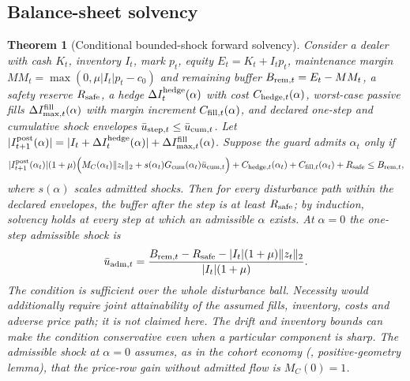 \documentclass[12pt]{article}
\newtheorem{theorem}{Theorem}[section]
\theoremstyle{definition}
\theoremstyle{remark}
\begin{document}
\subsection{Balance-sheet solvency}

\begin{theorem}[Conditional bounded-shock forward solvency]\label{thm:forward}
Consider a dealer with cash $K_t$, inventory $I_t$, mark $p_t$, equity $E_t=K_t+I_tp_t$, maintenance margin $MM_t=\max(0,\mu|I_t|p_t-c_0)$ and remaining buffer $B_{{\rm rem},t}=E_t-MM_t$, a safety reserve $R_{\rm safe}$, a hedge $\Delta I^{\rm hedge}_t(\alpha)$ with cost $C_{{\rm hedge},t}(\alpha)$, worst-case passive fills $\Delta I^{\rm fill}_{\max,t}(\alpha)$ with margin increment $C_{{\rm fill},t}(\alpha)$, and declared one-step and cumulative shock envelopes $\bar u_{{\rm step},t}\le\bar u_{{\rm cum},t}$. Let $|I^{\rm post}_{t+1}(\alpha)|=|I_t+\Delta I^{\rm hedge}_t(\alpha)|+\Delta I^{\rm fill}_{\max,t}(\alpha)$. Suppose the guard admits $\alpha_t$ only if
\begin{equation}\label{eq:guardineq}
|I^{\rm post}_{t+1}(\alpha_t)|(1+\mu)\Bigl(M_{C}(\alpha_t)\|z_t\|_2+s(\alpha_t)G_{\rm cum}(\alpha_t)\bar u_{{\rm cum},t}\Bigr)+C_{{\rm hedge},t}(\alpha_t)+C_{{\rm fill},t}(\alpha_t)+R_{\rm safe}\le B_{{\rm rem},t},
\end{equation}
where $s(\alpha)$ scales admitted shocks. Then for every disturbance path within the declared envelopes, the buffer after the step is at least $R_{\rm safe}$; by induction, solvency holds at every step at which an admissible $\alpha$ exists. At $\alpha=0$ the one-step admissible shock is
\[
\bar u_{{\rm adm},t}=\frac{B_{{\rm rem},t}-R_{\rm safe}-|I_t|(1+\mu)\|z_t\|_2}{|I_t|(1+\mu)} .
\]
The condition is sufficient over the whole disturbance ball. Necessity would additionally require joint attainability of the assumed fills, inventory, costs and adverse price path; it is not claimed here. The drift and inventory bounds can make the condition conservative even when a particular component is sharp. The admissible shock at $\alpha=0$ assumes, as in the cohort economy (\citealp{niroula2026}, positive-geometry lemma), that the price-row gain without admitted flow is $M_C(0)=1$.
\end{theorem}
\end{document}
